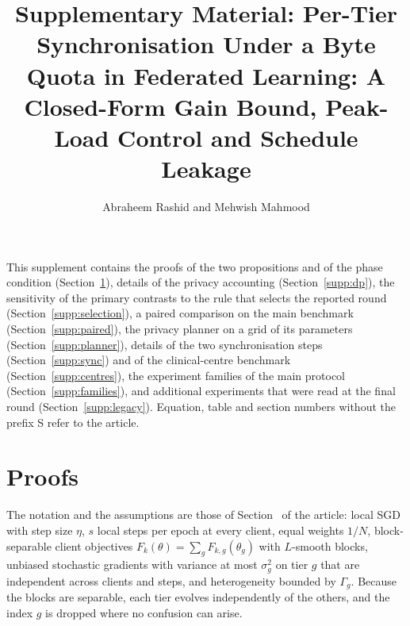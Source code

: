 \documentclass[journal]{IEEEtran}
\begin{document}
\title{Supplementary Material: Per-Tier Synchronisation Under a Byte Quota in Federated Learning: A Closed-Form Gain Bound, Peak-Load Control and Schedule Leakage}
\author{Abraheem Rashid and Mehwish Mahmood}
\maketitle

This supplement contains the proofs of the two propositions and of the phase condition (Section~\ref{supp:proofs}), details of the privacy accounting (Section~\ref{supp:dp}), the sensitivity of the primary contrasts to the rule that selects the reported round (Section~\ref{supp:selection}), a paired comparison on the main benchmark (Section~\ref{supp:paired}), the privacy planner on a grid of its parameters (Section~\ref{supp:planner}), details of the two synchronisation steps (Section~\ref{supp:sync}) and of the clinical-centre benchmark (Section~\ref{supp:centres}), the experiment families of the main protocol (Section~\ref{supp:families}), and additional experiments that were read at the final round (Section~\ref{supp:legacy}). Equation, table and section numbers without the prefix S refer to the article.

\section{Proofs}
\label{supp:proofs}
The notation and the assumptions are those of Section~ of the article: local SGD with step size $\eta$, $s$ local steps per epoch at every client, equal weights $1/N$, block-separable client objectives $F_k(\theta)=\sum_gF_{k,g}(\theta_g)$ with $L$-smooth blocks, unbiased stochastic gradients with variance at most $\sigma_g^2$ on tier $g$ that are independent across clients and steps, and heterogeneity bounded by $\Gamma_g$. Because the blocks are separable, each tier evolves independently of the others, and the index $g$ is dropped where no confusion can arise.
\end{document}
